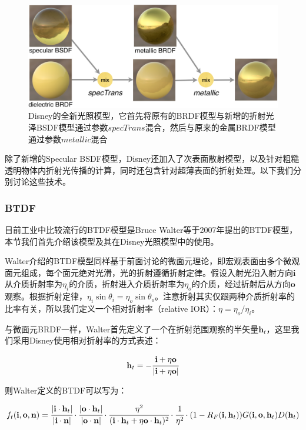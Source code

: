 \begin{figure}
	\includegraphics[width=\textwidth]{figures/intro/Disney-bsdf}
	\caption{Disney的全新光照模型，它首先将原有的BRDF模型与新增的折射光泽BSDF模型通过参数$specTrans$混合，然后与原来的金属BRDF模型通过参数$metallic$混合}
	\label{f:intro-Disney-bsdf}
\end{figure}

除了新增的Specular BSDF模型，Disney还加入了次表面散射模型，以及针对粗糙透明物体内折射光传播的计算，同时还包含针对超薄表面的折射处理。以下我们分别讨论这些技术。





\subsubsection{BTDF}
目前工业中比较流行的BTDF模型是Bruce Walter等\cite{a:Microfacetmodelsforrefractionthroughroughsurfaces}于2007年提出的BTDF模型，本节我们首先介绍该模型及其在Disney光照模型中的使用。

Walter介绍的BTDF模型同样基于前面讨论的微面元理论，即宏观表面由多个微观面元组成，每个面元绝对光滑，光的折射遵循折射定律。假设入射光沿入射方向$\mathbf{i}$从介质折射率为$\eta_i$的介质，折射进入介质折射率为$\eta_o$的介质，经过折射后从方向$\mathbf{o}$观察。根据折射定律，$\eta_i \sin\theta_i=\eta_o \sin\theta_o$。注意折射其实仅跟两种介质折射率的比率有关，所以我们定义一个相对折射率（relative IOR）：$\eta=\eta_o/\eta_i$。

与微面元BRDF一样，Walter首先定义了一个在折射范围观察的半矢量$\mathbf{h}_t$，这里我们采用Disney使用相对折射率的方式表述：

\begin{equation}
	\mathbf{h}_t=- \cfrac{\mathbf{i}+\eta\mathbf{o}}{|\mathbf{i}+\eta\mathbf{o}|}
\end{equation}

\noindent 则Walter定义的BTDF可以写为：

\begin{equation}
	f_t(\mathbf{i},\mathbf{o},\mathbf{n})= \cfrac{|\mathbf{i}\cdot\mathbf{h}_t|}{|\mathbf{i}\cdot\mathbf{n}|}\cdot \cfrac{|\mathbf{o}\cdot\mathbf{h}_t|}{|\mathbf{o}\cdot\mathbf{n}|}\cdot \cfrac{\eta^2}{(\mathbf{i}\cdot\mathbf{h}_t+\eta\mathbf{o}\cdot\mathbf{h}_t)^2}\cdot \cfrac{1}{\eta^2}\cdot (1-R_F(\mathbf{i},\mathbf{h}_t))G(\mathbf{i},\mathbf{o},\mathbf{h}_t)D(\mathbf{h}_t)
\end{equation}

